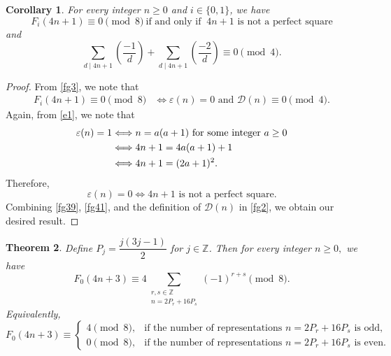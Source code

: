 \documentclass[12pt]{article}
\numberwithin{equation}{section}
\newtheorem{theorem}{Theorem}[section]
\newtheorem{corollary}[theorem]{Corollary}
\theoremstyle{definition}
\theoremstyle{remark}
\numberwithin{equation}{section}
\begin{document}
\begin{corollary}
For every integer $n\geq0$  and $i\in\{0,1\}$, we have
$$F_i(4n+1)\equiv0\pmod8 ~\text{if and only if } ~4n+1 \text{ is not a perfect square}$$
and 
$$\sum_{d\mid 4n+1}\left(\dfrac{-1}{d}\right)
+
\sum_{d\mid 4n+1}\left(\dfrac{-2}{d}\right)\equiv0\pmod4.$$ 
\end{corollary}
\begin{proof}
From \eqref{fg3}, we note that
\begin{align}\label{fg39}
F_i(4n+1)\equiv0\pmod8
&\Longleftrightarrow
\varepsilon(n)=0
\text{ and }
\mathcal{D}(n)\equiv0\pmod4.
\end{align}
Again, from \eqref{e1}, we note that
\begin{align}
\varepsilon(n)=1
&\Longleftrightarrow
n=a(a+1)\text{ for some integer }a\geq0 \notag\\
&\Longleftrightarrow
4n+1=4a(a+1)+1 \notag\\
&\Longleftrightarrow
4n+1=(2a+1)^2.\notag
\end{align}
Therefore,
\begin{equation}\label{fg41}
\varepsilon(n)=0
\Longleftrightarrow
4n+1 \text{ is not a perfect square}.
\end{equation} Combining \eqref{fg39}, \eqref{fg41}, and the definition of $\mathcal{D}(n)$ in  \eqref{fg2}, we obtain our desired result. 
\end{proof}

\begin{theorem}Define  $P_j=\dfrac{j(3j-1)}{2}$ for $j\in\mathbb Z$. Then for every integer $n\geq0,$  we have 
\begin{equation}\label{new1}
F_0(4n+3)\equiv
4\sum_{\substack{r,s\in\mathbb{Z}\\ n=2P_r+16P_s}}
(-1)^{r+s}
\pmod 8.
\end{equation}
Equivalently,
\begin{equation}\label{new2}
F_0(4n+3)\equiv
\begin{cases}
4 \pmod 8, & \text{if the number of representations } n=2P_r+16P_s \text{ is odd},\\
0 \pmod 8, & \text{if the number of representations } n=2P_r+16P_s \text{ is even}.
\end{cases}
\end{equation}
\end{theorem}
\end{document}
